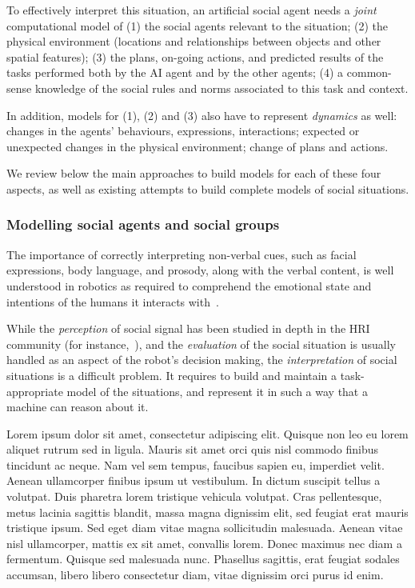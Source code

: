 To effectively interpret this situation, an artificial social agent needs a \emph{joint}
computational model of (1) the social agents relevant to the situation; (2) the
physical environment (locations and relationships between objects and other
spatial features); (3) the plans, on-going actions, and predicted results of the
tasks performed both by the AI agent and by the other agents; (4) a common-sense
knowledge of the social rules and norms associated to this task and context.

In addition, models for (1), (2) and (3) also have to represent \emph{dynamics} as
well: changes in the agents' behaviours, expressions, interactions; expected or
unexpected changes in the physical environment; change of plans and actions.

We review below the main approaches to build models for each of these four
aspects, as well as existing attempts to build complete models of social situations.


\subsubsection{Modelling social agents and social groups}

The importance of correctly interpreting non-verbal cues, such as facial
expressions, body language, and prosody, along with the verbal content, is well
understood in robotics as required to comprehend the emotional state and
intentions of the humans it interacts with~\cite{breazeal2003emotion}.

While the \emph{perception} of social signal has been studied in depth in the
HRI community (for instance,~\cite{pantic2011social}), and the \emph{evaluation} of
the social situation is usually handled as an aspect of the robot's decision
making, the \emph{interpretation} of social situations is a difficult problem.
It requires to build and maintain a task-appropriate model of the situations,
and represent it in such a way that a machine can reason about it.

\begin{rewrite}
Lorem ipsum dolor sit amet, consectetur adipiscing elit. Quisque non leo eu
lorem aliquet rutrum sed in ligula. Mauris sit amet orci quis nisl commodo
finibus tincidunt ac neque. Nam vel sem tempus, faucibus sapien eu,
imperdiet velit. Aenean ullamcorper finibus ipsum ut vestibulum. In dictum
suscipit tellus a volutpat. Duis pharetra lorem tristique vehicula volutpat.
Cras pellentesque, metus lacinia sagittis blandit, massa magna dignissim
elit, sed feugiat erat mauris tristique ipsum. Sed eget diam vitae magna
sollicitudin malesuada. Aenean vitae nisl ullamcorper, mattis ex sit amet,
convallis lorem. Donec maximus nec diam a fermentum. Quisque sed malesuada
nunc. Phasellus sagittis, erat feugiat sodales accumsan, libero libero
consectetur diam, vitae dignissim orci purus id enim.
\end{rewrite}



